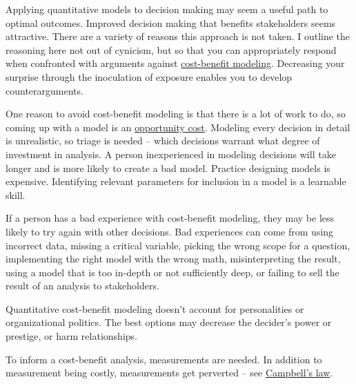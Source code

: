 Applying quantitative models to decision making may seem a useful path to optimal outcomes. Improved decision making that benefits stakeholders seems attractive. There are a variety of reasons this approach is not taken. I outline the reasoning here not out of cynicism, but so that you can appropriately respond when confronted with arguments against \href{https://en.wikipedia.org/wiki/Cost\%E2\%80\%93benefit_analysis}{cost-benefit modeling}.
Decreasing your surprise through the inoculation of exposure enables you to develop counterarguments. 

One reason to avoid cost-benefit modeling is that there is a lot of work to do, so coming up with a model is an \href{https://en.wikipedia.org/wiki/Opportunity_cost}{opportunity cost}. 
Modeling every decision in detail is unrealistic, so triage is needed -- which decisions warrant what degree of investment in analysis. A person inexperienced in modeling decisions will take longer and is more likely to create a bad model. Practice designing models is expensive. Identifying relevant parameters for inclusion in a model is a learnable skill. 

If a person has a bad experience with cost-benefit modeling, they may be less likely to try again with other decisions. Bad experiences can come from using incorrect data, missing a critical variable, picking the wrong scope for a question, implementing the right model with the wrong math, misinterpreting the result, using a model that is too in-depth or not sufficiently deep, or failing to sell the result of an analysis to stakeholders.

Quantitative cost-benefit modeling doesn't account for personalities or organizational politics. The best options may decrease the decider's power or prestige, or harm relationships. 

To inform a cost-benefit analysis, measurements are needed. In addition to measurement being costly, measurements get perverted -- see \href{https://en.wikipedia.org/wiki/Campbell\%27s_law}{Campbell's law}. 

